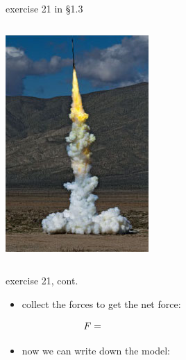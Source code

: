 \documentclass{beamer}
\begin{document}
\begin{frame}{exercise 21 in \S 1.3}
\begin{columns}
\begin{column}{0.3\textwidth}
\includegraphics[width=\textwidth]{figs/exercise-21-1-3}
\end{column}
\end{columns}


\end{frame}


\begin{frame}{exercise 21, cont.}

\begin{itemize}
\item collect the forces to get the net force:

$$F = \hspace{70mm}$$
\vspace{10mm}

\item now we can write down the model:

\vspace{30mm}
\end{itemize}
\end{frame}
\end{document}
